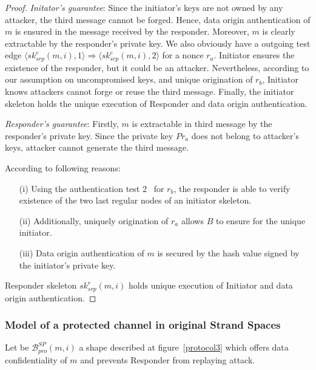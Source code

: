 \begin{proof}

\emph{Initator's guarantee}: Since the initiator’s keys are not owned by any attacker, the third message cannot be forged. Hence, data origin authentication of $m$ is ensured in the message received by the responder. Moreover, $m$ is clearly extractable by the responder's private key. 
We also obviously have a outgoing test edge $\langle sk^e_{srp}(m,i),1 \rangle \Rightarrow \langle sk^e_{srp}(m,i),2 \rangle$ for a nonce $r_a$. Initiator ensures the existence of the responder, but it could be an attacker. Nevertheless, according to our assumption on uncompromised keys, and unique origination of $r_b$, Initiator knows attackers cannot forge or reuse the third message. Finally, the initiator skeleton holds the unique execution of Responder and data origin authentication.

\emph{Responder's guarantee}: Firstly, $m$ is extractable in third message by the responder's private key. Since the private key $Pr_a$ does not belong to attacker’s keys, attacker cannot generate the third message. 

According to following reasons: 
\begin{enumerate}
\item[(i)] Using the authentication test 2~\cite{Guttman:2002:ATS:568264.568267} for $r_b$, the responder is able to verify existence of the two last regular nodes of an initiator skeleton.
\item[(ii)] Additionally, uniquely origination of $r_a$ allows $B$ to ensure for the unique initiator.
\item [(iii)] Data origin authentication of $m$ is secured by the hash value signed by the initiator's private key. 
\end{enumerate}

Responder skeleton $sk^r_{srp}(m,i)$ holds unique execution of Initiator and data origin authentication.
 \end{proof}

\subsubsection*{Model of a protected channel in original Strand Spaces}\label{protect}

Let be $\mathcal{B}^{SP}_{pro}(m,i)$ a shape described at figure~\ref{protocol3} which offers data confidentiality of $m$ and prevents Responder from replaying attack. 

